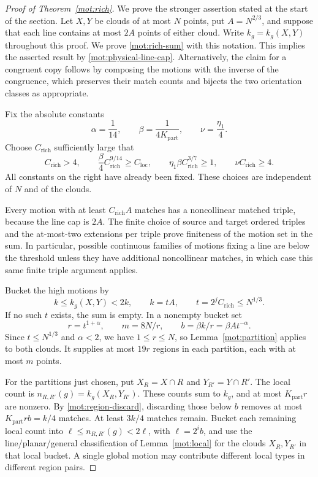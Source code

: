 \begin{proof}[Proof of Theorem~\ref{mot:rich}]
We prove the stronger assertion stated at the start of the section.
Let \(X,Y\) be
clouds of at most \(N\) points, put \(A=N^{2/3}\), and suppose
that each line contains at most \(2A\) points of either cloud.
Write \(k_g=k_g(X,Y)\) throughout this proof.  We prove
\eqref{mot:rich-sum} with this notation.  This implies
the asserted result by \eqref{mot:physical-line-cap}.  Alternatively,
the claim for a congruent copy follows by composing the motions
with the inverse of the congruence, which preserves their match
counts and bijects the two orientation classes as appropriate.

Fix the absolute constants
\[
 \alpha=\frac1{14},\qquad
 \beta=\frac1{4K_{\mathrm{part}}},\qquad
 \nu=\frac{\eta_1}{4}.
\]
Choose \(C_{\mathrm{rich}}\) sufficiently large that
\begin{equation}
\label{mot:constant-choices}
 C_{\mathrm{rich}}>4,\qquad
 \frac\beta4 C_{\mathrm{rich}}^{9/14}
      \ge C_{\mathrm{loc}},\qquad
 \eta_1\beta C_{\mathrm{rich}}^{3/7}\ge1,\qquad
 \nu C_{\mathrm{rich}}\ge4.
\end{equation}
All constants on the right have already been fixed.  These choices
are independent of \(N\) and of the clouds.

Every motion with at least \(C_{\mathrm{rich}}A\) matches has a
noncollinear matched triple, because the line cap is \(2A\).
The finite choice of source and target ordered triples and the
at-most-two extensions per triple prove finiteness of the motion
set in the sum.  In particular, possible continuous families of
motions fixing a line are below the threshold unless they have
additional noncollinear matches, in which case this same finite
triple argument applies.

Bucket the high motions by
\[
 k\le k_g(X,Y)<2k,\qquad
 k=tA,\qquad t=2^jC_{\mathrm{rich}}\le N^{1/3}.
\]
If no such \(t\) exists, the sum is empty.  In a nonempty bucket
set
\begin{equation}
\label{mot:subdivision-parameters}
 r=t^{1+\alpha},\qquad
 m=8N/r,\qquad
 b=\beta k/r=\beta A t^{-\alpha}.
\end{equation}
Since \(t\le N^{1/3}\) and \(\alpha<2\), we have
\(1\le r\le N\), so Lemma~\ref{mot:partition} applies to both
clouds.  It supplies at most \(19r\) regions in each partition,
each with at most \(m\) points.

For the partitions just chosen, put \(X_R=X\cap R\) and
\(Y_{R'}=Y\cap R'\).  The local count is
\(n_{R,R'}(g)=k_g(X_R,Y_{R'})\).  These counts sum to \(k_g\),
and at most \(K_{\mathrm{part}}r\) are nonzero.  By
\eqref{mot:region-discard}, discarding those below \(b\) removes
at most \(K_{\mathrm{part}}rb=k/4\) matches.  At least \(3k/4\)
matches remain.
Bucket each remaining local count into
\(\ell\le n_{R,R'}(g)<2\ell\), with \(\ell=2^i b\), and
use the line/planar/general classification of
Lemma~\ref{mot:local} for the clouds \(X_R,Y_{R'}\) in that local
bucket.  A single global motion may contribute different local types
in different region pairs.


\end{proof}
